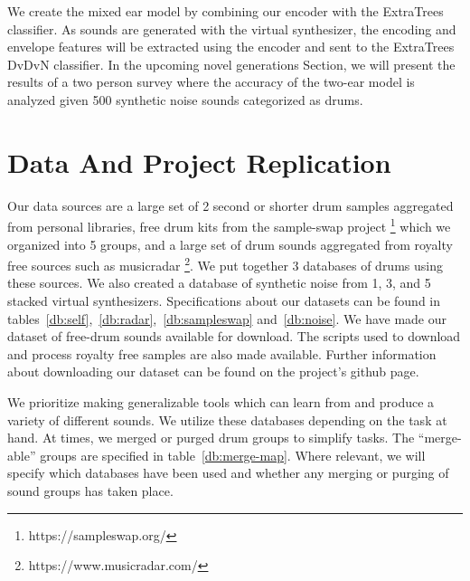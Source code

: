 \documentclass[\main/thesis.tex]{subfiles}
\begin{document}
We create the mixed ear model by combining our encoder with the ExtraTrees classifier. As sounds are generated with the virtual synthesizer, the encoding and envelope features will be extracted using the encoder and sent to the ExtraTrees DvDvN classifier. In the upcoming novel generations Section, we will present the results of a two person survey where the accuracy of the two-ear model is analyzed given 500 synthetic noise sounds categorized as drums. 



\section{Data And Project Replication}
\label{sec:data}
Our data sources are a large set of 2 second or shorter drum samples aggregated from personal libraries, free drum kits from the sample-swap project \footnote{https://sampleswap.org/} which we organized into 5 groups, and a large set of drum sounds aggregated from royalty free sources such as musicradar \footnote{https://www.musicradar.com/}. We put together 3 databases of drums using these sources. We also created a database of synthetic noise from 1, 3, and 5 stacked virtual synthesizers. Specifications about our datasets can be found in tables~\ref{db:self},~\ref{db:radar},~\ref{db:sampleswap} and~\ref{db:noise}. We have made our dataset of free-drum sounds available for download. The scripts used to download and process royalty free samples are also made available. Further information about downloading our dataset can be found on the project's github page. 

We prioritize making generalizable tools which can learn from and produce a variety of different sounds. We utilize these databases depending on the task at hand. At times, we merged or purged drum groups to simplify tasks. The \enquote{merge-able} groups are specified in table~\ref{db:merge-map}. Where relevant, we will specify which databases have been used and whether any merging or purging of sound groups has taken place. 

\end{document}
